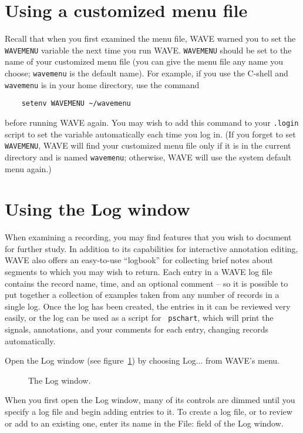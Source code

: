 \documentclass[twoside]{book}
\newcommand{\button}[1]{\cornersize{2}\ovalbox{\rule[-.3mm]{0cm}{2.5mm}\small\sf ~#1~}}
\newcommand{\menubutton}[1]{\button{#1~\ensuremath{\nabla}}}
\newcommand{\WAVE}{{\sf WAVE}\xspace}
\begin{document}
\section{Using a customized menu file}

Recall that when you first examined the menu file, \WAVE{}
warned you to set the {\tt WAVEMENU} variable the next time you run \WAVE{}.
{\tt WAVEMENU} should be set to the name of your customized menu file (you
can give the menu file any name you choose;  {\tt wavemenu} is the default
name).  For example, if you use the C-shell and {\tt wavemenu} is in your home
directory, use the command
\begin{verbatim}
    setenv WAVEMENU ~/wavemenu
\end{verbatim}
before running \WAVE{} again.  You may wish to add this command to your
{\tt .login} script to set the variable automatically each time you log in.
(If you forget to set {\tt WAVEMENU}, \WAVE{} will find your customized menu
file only if it is in the current directory and is named {\tt wavemenu};
otherwise, \WAVE{} will use the system default menu again.)

\section{Using the {\sf Log} window}

When examining a recording, you may find features that you wish to
document for further study.  In addition to its capabilities for
interactive annotation editing, \WAVE{} also offers an easy-to-use
``logbook'' for collecting brief notes about segments to which you
may wish to return.  Each entry in a \WAVE{} log file contains the
record name, time, and an optional comment -- so it is possible to
put together a collection of examples taken from any number of records
in a single log.  Once the log has been created, the entries in it can be
reviewed very easily, or the log can be used as a script for {\tt
pschart}, which will print the signals, annotations, and your comments
for each entry, changing records automatically.

Open the {\sf Log} window (see figure~\ref{fig:log-window}) by choosing
{\sf Log...} from \WAVE{}'s \menubutton{File} menu.
\begin{figure}
\begin{htmlonly}
\end{htmlonly}
\begin{latexonly}
\end{latexonly}
\centerline{}
\caption{The {\sf Log} window.}
\label{fig:log-window}
\end{figure}
When you first open the {\sf Log} window, many of its controls are
dimmed until you specify a log file and begin adding entries to it.
To create a log file, or to review or add to an existing one, enter
its name in the {\sf File:} field of the {\sf Log} window.
\end{document}
